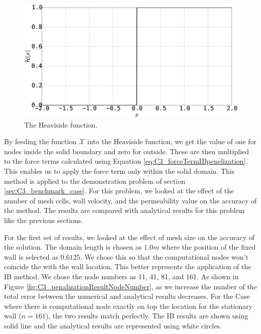 \begin{figure}[H]
	\centering
	\includegraphics[width=14.cm]{Chapter_3/figure/Heaviside_Function.eps}
	\caption{The Heaviside function.}
	\label{fig:C3_heavisideFunction}
\end{figure}

By feeding the function $\mathcal{X}$ into the Heaviside function, we get the value of one for nodes inside the solid boundary and zero for outside. These are then multiplied to the force terms calculated using Equation \eqref{eq:C3_forceTermIBpenelization}. This enables us to apply the force term only within the solid domain. This method is applied to the demonstration problem of section \ref{sec:C3_benchmark_case}. For this problem, we looked at the effect of the number of mesh cells, wall velocity, and the permeability value on the accuracy of the method. The results are compared with analytical results for this problem like the previous sections.

For the first set of results, we looked at the effect of mesh size on the accuracy of the solution. The domain length is chosen as $1.0 m$ where the position of the fixed wall is selected as $0.6125$. We chose this so that the computational nodes won't coincide the with the wall location. This better represents the application of the IB method. We chose the node numbers as 11, 41, 81, and 161. As shown in Figure \ref{fig:C3_penalizationResultNodeNumber}, as we increase the number of the total error between the numerical and analytical results decreases. For the Case where there is computational node exactly on top the location for the stationary wall ($n=161$), the two results match perfectly. The IB results are shown using solid line and the analytical results are represented using white circles.

